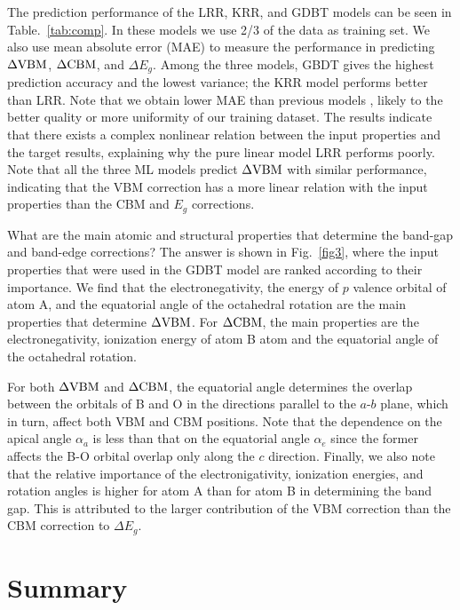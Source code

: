 \documentclass[%
reprint,
superscriptaddress,
citeautoscript,
 amsmath,amssymb,
 aps,
 prl,
floatfix,
]{revtex4-1}
\begin{document}
The prediction performance of the LRR, KRR, and GDBT models can be seen in 
Table.~\ref{tab:comp}. In these models we use 2/3 of the data as training set. We also use mean absolute error (MAE) to measure the performance in predicting $\Delta {\rm VBM}$, $\Delta {\rm CBM}$, and $\Delta E_{g}$. Among the three models, GBDT gives the highest prediction accuracy and the lowest variance; the KRR model performs better than LRR.  Note that we obtain lower MAE than previous models \cite{Zhuo2018,Gladkikh2020,Pilania2017,Zhuo2018,Rajan2018}, likely to the better quality or more uniformity of our training dataset. The results indicate that there exists a complex nonlinear relation between the input properties and the target results, explaining why the pure linear model LRR performs poorly.  Note that all the three ML models predict $\Delta {\rm VBM}$ with similar performance, indicating that the VBM correction has a more linear relation with the input properties than the CBM and $E_g$ corrections.

What are the main atomic and structural properties that determine the band-gap and band-edge corrections? The answer is shown in Fig.~\ref{fig3}, where the input properties that were used in the GDBT model are ranked according to their importance. We find that the electronegativity, the energy of $p$ valence orbital of atom A, and the equatorial angle of the octahedral rotation are the main properties that determine $\Delta {\rm VBM}$. For $\Delta {\rm CBM}$, the main properties are the electronegativity, ionization energy of atom B atom and the equatorial angle of the octahedral rotation.
  
For both $\Delta {\rm VBM}$ and $\Delta {\rm CBM}$, the equatorial angle determines the overlap between the orbitals of B and O in the directions parallel to the $a$-$b$ plane, which in turn, affect both VBM and CBM positions. Note that the dependence on the apical angle $\alpha_a$ is less than that on the equatorial angle $\alpha_e$ since the former affects the B-O orbital overlap only along the $c$ direction.  Finally, we also note that the relative importance of the electronigativity, ionization energies, and rotation angles is higher for atom A than for atom B in determining the band gap.  This is attributed to the larger contribution of the VBM correction than the CBM correction to $\Delta E_{g}$.


\section{Summary}
\end{document}
